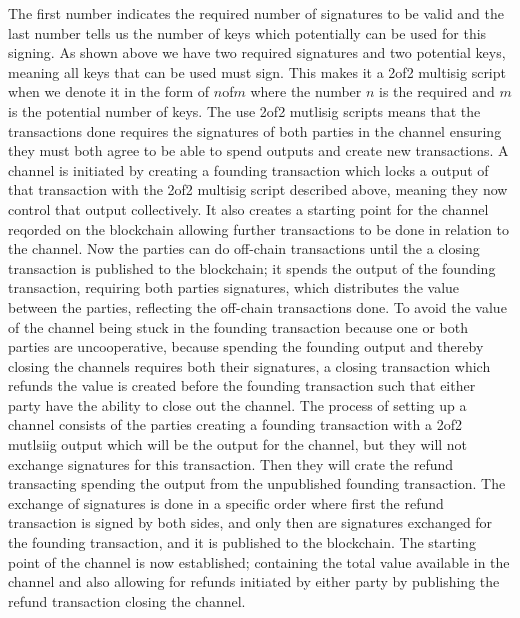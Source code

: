 The first number indicates the required number of signatures to be valid and the last number tells us the number of keys which potentially can be used for this signing. As shown above we have two required signatures and two potential keys, meaning all keys that can be used must sign. This makes it a 2of2 multisig script when we denote it in the form of $n$of$m$ where the number $n$ is the required and $m$ is the potential number of keys. The use 2of2 mutlisig scripts means that the transactions done requires the signatures of both parties in the channel ensuring they must both agree to be able to spend outputs and create new transactions.
A channel is initiated by creating a founding transaction which locks a output of that transaction with the 2of2 multisig script described above, meaning they now control that output collectively. It also creates a starting point for the channel reqorded on the blockchain allowing further transactions to be done in relation to the channel. Now the parties can do off-chain transactions until the a closing transaction is published to the blockchain; it spends the output of the founding transaction, requiring both parties signatures, which distributes the value between the parties, reflecting the off-chain transactions done.
To avoid the value of the channel being stuck in the founding transaction because one or both parties are uncooperative, because spending the founding output and thereby closing the channels requires both their signatures, a closing transaction which refunds the value is created before the founding transaction such that either party have the ability to close out the channel. The process of setting up a channel consists of the parties creating a founding transaction with a 2of2 mutlsiig output which will be the output for the channel, but they will not exchange signatures for this transaction. Then they will crate the refund transacting spending the output from the unpublished founding transaction. The exchange of signatures is done in a specific order where first the refund transaction is signed by both sides, and only then are signatures exchanged for the founding transaction, and it is published to the blockchain. The starting point of the channel is now established; containing the total value available in the channel and also allowing for refunds initiated by either party by publishing the refund transaction closing the channel. 
\\

